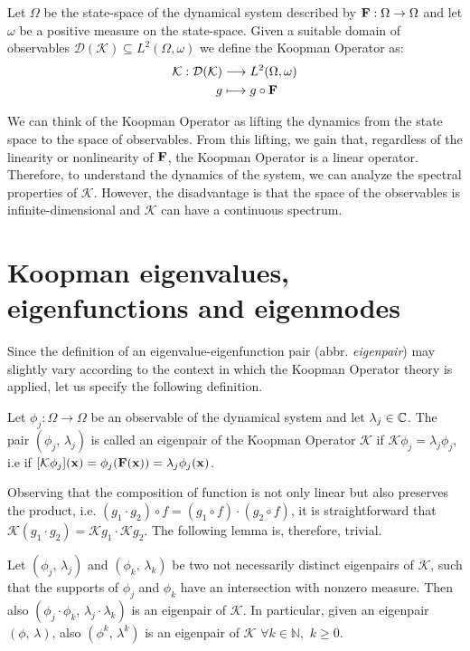 \begin{definition}
Let $\Omega$ be the state-space of the dynamical system described by $\vb{F}:\Omega\to\Omega$ and let $\omega$ be a positive measure on the state-space. Given a suitable domain of observables $\mathcal{D}(\mathcal{K}) \subseteq L^2(\Omega, \omega)$ we define the Koopman Operator as:
\begin{equation}
    \label{koopman_def}
    \begin{split}
       \mathcal{K} : \mathcal{D}(\mathcal{K}) &\longrightarrow L^2(\Omega, \omega)
       \\
       g & \longmapsto g \circ \vb{F}
    \end{split}    
\end{equation} 
\end{definition}

We can think of the Koopman Operator as lifting the dynamics from the state space to the space of observables. From this lifting, we gain that, regardless of the linearity or nonlinearity of $\vb{F}$, the Koopman Operator is a linear operator. Therefore, to understand the dynamics of the system, we can analyze the spectral properties of $\mathcal{K}$. However, the disadvantage is that the space of the observables is infinite-dimensional and $\mathcal{K}$ can have a continuous spectrum. 

\section{Koopman eigenvalues, eigenfunctions and eigenmodes}

Since the definition of an eigenvalue-eigenfunction pair (abbr. \emph{eigenpair}) may slightly vary according to the context in which the Koopman Operator theory is applied, let us specify the following definition.
\begin{definition}
Let $\phi_j:\Omega\to\Omega$ be an observable of the dynamical system and let $\lambda_j\in\mathbb{C}$. The pair $(\phi_j, \,\lambda_j)$ is called an eigenpair of the Koopman Operator $\mathcal{K}$ if $\mathcal{K}\phi_j = \lambda_j\phi_j$, i.e if $[\mathcal{K}\phi_j](\vb{x}) = \phi_j(\vb{F}(\vb{x})) = \lambda_j\phi_j(\vb{x})$.
\end{definition}

Observing that the composition of function is not only linear but also preserves the product, i.e. $(g_1 \cdot g_2) \circ f = (g_1 \circ f) \cdot (g_2 \circ f)$, it is straightforward that $\mathcal{K}(g_1\cdot g_2) = \mathcal{K}g_1\cdot \mathcal{K}g_2$. The following lemma is, therefore, trivial.
\begin{lemma}
\label{eigenpair_multiplication}
Let $(\phi_j, \,\lambda_j)$ and $(\phi_k, \,\lambda_k)$ be two not necessarily distinct eigenpairs of $\mathcal{K}$, such that the supports of $\phi_j$ and $\phi_k$ have an intersection with nonzero measure. Then also $(\phi_j\cdot\phi_k, \,\lambda_j\cdot\lambda_k)$ is an eigenpair of $\mathcal{K}$. In particular, given an eigenpair $(\phi, \,\lambda)$, also $(\phi^k, \,\lambda^k)$ is an eigenpair of $\mathcal{K}$ $\forall k\in\mathbb{N},\,\, k \geq 0$.
\end{lemma}

